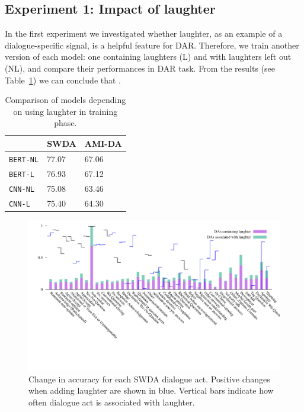 \documentclass[11pt,a4paper]{article}
\begin{document}
\subsection{Experiment 1: Impact of laughter} \label{sec:experiment1}   %
In the first experiment we investigated whether laughter, as an example of a dialogue-specific signal, is a helpful feature for DAR.
Therefore, we train another version of each model: one containing laughters (L) and with laughters left out (NL), and compare their performances in DAR task.
From the results (see Table~\ref{tab:laughter}) we can conclude that .
\begin{table}
  \label{tab:laughter}
  \centering
  \begin{tabular}{@{}lll@{}}
    \toprule
                      & SWDA  & AMI-DA \\ \midrule
    \texttt{BERT-NL}  & 77.07 & 67.06       \\ 
    \texttt{BERT-L}   & 76.93 & 67.12       \\ \midrule
    \texttt{CNN-NL}   & 75.08 & 63.46        \\
    \texttt{CNN-L}    & 75.40 & 64.30        \\ \bottomrule
    
  \end{tabular}
  \caption{Comparison of models depending on using laughter in training phase.}
\end{table}

\begin{figure}
  \centering
  \includegraphics[width=\textwidth]{img/SWDA-bertLvsNL.pdf}
  \caption{Change in accuracy for each SWDA dialogue act. Positive changes when adding laughter are shown in blue. Vertical bars indicate how often dialogue act is associated with laughter.}
\end{figure}
\end{document}
